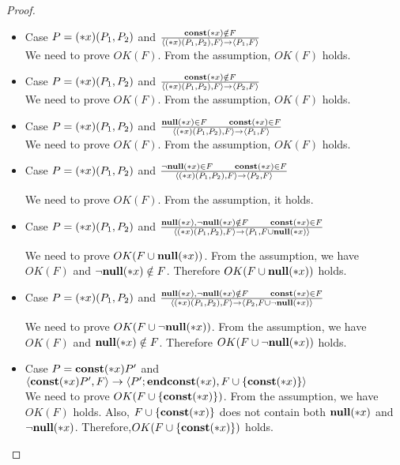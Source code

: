 \begin{proof}
\begin{itemize}
    \item Case \( P = (*x)(P_1,P_2)\) and \( \frac{\mathbf{const}(*x) \notin F}
      { \langle (*x)(P_1, P_2), F \rangle
      \rightarrow \langle P_1, F \rangle } \) \\
      We need to prove \( OK(F)\). From the assumption, \(OK(F)\) holds.

    \item Case \( P = (*x)(P_1,P_2)\) and \( \frac{\mathbf{const}(*x) \notin F}
      { \langle (*x)(P_1, P_2), F \rangle
      \rightarrow \langle P_2, F \rangle } \) \\
      We need to prove \( OK(F)\). From the assumption, \(OK(F)\) holds.

    \item Case \( P = (*x)(P_1,P_2)\) and \( \frac{ {\bf null}(*x) \in F \quad\quad \mathbf{const}(*x) \in F}
      { \langle (*x)(P_1, P_2), F \rangle
      \rightarrow \langle P_1, F \rangle } \) \\
      We need to prove \( OK(F)\). From the assumption, \(OK(F)\) holds.

    \item Case \( P = (*x)(P_1,P_2)\) and \( \frac{\neg{\bf null}(*x) \in F
      \quad\quad \mathbf{const}(*x) \in F} { \langle (*x)(P_1, P_2), F \rangle
      \rightarrow \langle P_2, F \rangle } \)
      
      We need to prove \( OK(F)\). From the assumption, it holds.

    \item Case \( P = (*x)(P_1,P_2)\) and \( \frac{{\bf null}(*x), \neg{\bf null}(*x) \notin F
      \quad\quad \mathbf{const}(*x) \in F} { \langle (*x)(P_1, P_2), F \rangle
      \rightarrow \langle P_1, F\cup{{\bf null}(*x)} \rangle } \)
      
      We need to prove \( OK(F\cup{{\bf null}(*x)})\). From the assumption, we
      have \(OK(F)\) and \(\neg{\bf null}(*x) \notin F\). Therefore
      \(OK(F\cup{{\bf null}(*x)})\) holds.

    \item Case \( P = (*x)(P_1,P_2)\) and \( \frac{{\bf null}(*x), \neg{\bf null}(*x) \notin F
      \quad\quad \mathbf{const}(*x) \in F} { \langle (*x)(P_1, P_2), F \rangle
      \rightarrow \langle P_2, F\cup{\neg{\bf null}(*x)} \rangle } \)
      
      We need to prove \( OK(F\cup{\neg{\bf null}(*x)})\). From the assumption, we
      have \(OK(F)\) and \({\bf null}(*x) \notin F\). Therefore
      \(OK(F\cup{\neg{\bf null}(*x)})\) holds.

    \item Case \( P = \mathbf{const}(*x) P'\) and \(  \langle \mathbf{const}(*x)
      P', F \rangle \rightarrow \langle P';\mathbf{endconst}(*x), F\cup\{\mathbf{const}(*x)\} \rangle \) \\
      We need to prove \( OK(F\cup\{\mathbf{const}(*x)\})\). From the
      assumption, we have \(OK(F)\) holds. Also,
      \(F\cup\{\mathbf{const}(*x)\}\) does not contain both \({\bf null}(*x)\) and \(
      \neg{\bf null}(*x)\). Therefore,\( OK(F\cup\{ \mathbf{const}(*x)\})\) holds.


\end{itemize}
\end{proof}
